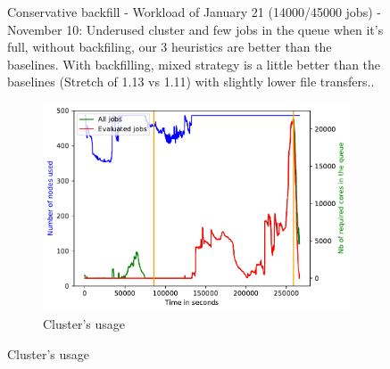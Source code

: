 \documentclass[a4paper]{article}
\begin{document}
\begin{figure}[H]
\caption{Conservative backfill - Workload of January 21 (14000/45000 jobs) - November 10: Underused cluster and few jobs in the queue when it's full, without backfiling, our 3 heuristics are better than the baselines. With backfilling, mixed strategy is a little better than the baselines (Stretch of 1.13 vs 1.11) with slightly lower file transfers..}\end{figure}

\begin{figure}[H]\centering
\begin{subfigure}[b]{0.4\linewidth}\centering\includegraphics[width=1\linewidth]{MBSS/plot/2022-03-15->2022-03-16_V9271_Fcfs_Used_nodes_450_128_32_256_4_1024.pdf}\caption{Cluster's usage}\end{subfigure}

\end{figure}
\end{document}
